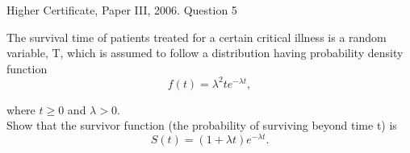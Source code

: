 \documentclass[a4paper,12pt]{article}
\begin{document}
Higher Certificate, Paper III, 2006. Question 5
\begin{framed}
\large
\noindent The survival time of patients treated for a certain critical illness is a random variable,
T, which is assumed to follow a distribution having probability density function
\[f(t) = \lambda^2 t e^{-\lambda t} ,\]

\noindent where $t \geq 0$ and $\lambda >0$. \\

\noindent Show that the survivor function (the probability of surviving beyond time t) is
\[S ( t ) = (1 + \lambda t ) e^{ - \lambda t} .\]
\end{framed}

\large
\end{document}
